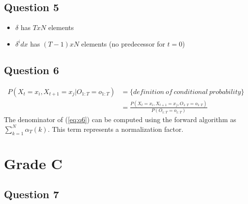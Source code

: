 \documentclass{scrartcl}
\begin{document}
\subsection{Question 5}

\begin{itemize}
 \item $\delta$ has $TxN$ elements
 \item $\delta^idx$ has $(T-1)xN$ elements (no predecessor for $t=0$)
\end{itemize}

\subsection{Question 6}

\begin{align} \label{eq:q6}
 P(X_t=x_i, X_{t+1}=x_j | O_{1:T}=o_{1:T}) &= \{definition\ of\ conditional\ probability\} \nonumber \\
 &= \frac{P(X_t=x_i, X_{t+1}=x_j, O_{1:T}=o_{1:T})}{P(O_{1:T}=o_{1:T})}
\end{align}
The denominator of (\ref{eq:q6}) can be computed using the forward algorithm as $\sum_{k=1}^N \alpha_T(k)$. This term represents a normalization factor.


\section{Grade C}

\subsection{Question 7}
\end{document}
